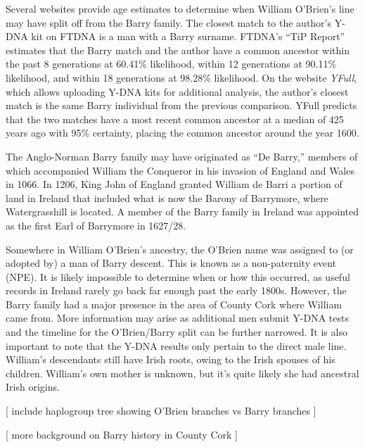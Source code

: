 Several websites provide age estimates to determine when William O'Bri\-en's line may have split off from the Barry family. The closest match to the author's Y-DNA kit on FTDNA is a man with a Barry surname. FTDNA's ``TiP Report'' estimates that the Barry match and the author have a common ancestor within the past 8 generations at 60.41\% likelihood, within 12 generations at 90.11\% likelihood, and within 18 generations at 98.28\% likelihood.\cite{TiP} On the website \textit{YFull}, which allows uploading Y-DNA kits for additional analysis, the author's closest match is the same Barry individual from the previous comparison. YFull predicts that the two matches have a most recent common ancestor at a median of 425 years ago with 95\% certainty, placing the common ancestor around the year 1600.\cite{YFull}

The Anglo-Norman Barry family may have originated as ``De Barry,'' members of which accompanied William the Conqueror in his invasion of England and Wales in 1066.\cite{BarryHistory1} In 1206, King John of England granted William de Barri a portion of land in Ireland that included what is now the Barony of Barrymore, where Watergrasshill is located.\cite{BarryHistory17} A member of the Barry family in Ireland was appointed as the first Earl of Barrymore in 1627/28.\cite{ParliamentaryGazetteer}

Somewhere in William O'Brien's ancestry, the O'Brien name was assigned to (or adopted by) a man of Barry descent. This is known as a non-paternity event (NPE). It is likely impossible to determine when or how this occurred, as useful records in Ireland rarely go back far enough past the early 1800s. However, the Barry family had a major presence in the area of County Cork where William came from. More information may arise as additional men submit Y-DNA tests and the timeline for the O'Brien/Barry split can be further narrowed. It is also important to note that the Y-DNA results only pertain to the direct male line. William's descendants still have Irish roots, owing to the Irish spouses of his children. William's own mother is unknown, but it's quite likely she had ancestral Irish origins.

[ include haplogroup tree showing O'Brien branches vs Barry branches ]

[ more background on Barry history in County Cork ]